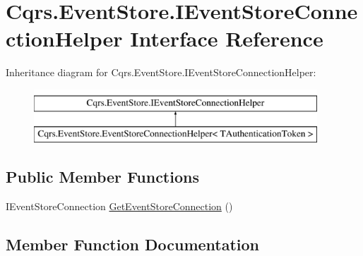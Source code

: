 \hypertarget{interfaceCqrs_1_1EventStore_1_1IEventStoreConnectionHelper}{}\section{Cqrs.\+Event\+Store.\+I\+Event\+Store\+Connection\+Helper Interface Reference}
\label{interfaceCqrs_1_1EventStore_1_1IEventStoreConnectionHelper}
Inheritance diagram for Cqrs.\+Event\+Store.\+I\+Event\+Store\+Connection\+Helper\+:\begin{figure}[H]
\begin{center}
\leavevmode
\includegraphics[height=2.000000cm]{interfaceCqrs_1_1EventStore_1_1IEventStoreConnectionHelper}
\end{center}
\end{figure}
\subsection*{Public Member Functions}
\begin{DoxyCompactItemize}
\item 
I\+Event\+Store\+Connection \hyperlink{interfaceCqrs_1_1EventStore_1_1IEventStoreConnectionHelper_a7efd07573a65ace6d520d3efdb5799f3_a7efd07573a65ace6d520d3efdb5799f3}{Get\+Event\+Store\+Connection} ()
\end{DoxyCompactItemize}


\subsection{Member Function Documentation}
\mbox{\label{interfaceCqrs_1_1EventStore_1_1IEventStoreConnectionHelper_a7efd07573a65ace6d520d3efdb5799f3_a7efd07573a65ace6d520d3efdb5799f3}} 
